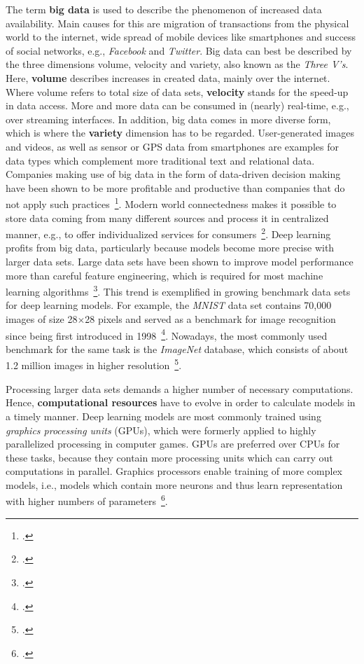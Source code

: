 The term \textbf{big data} is used to describe the phenomenon of increased data
availability.
Main causes for this are migration of transactions from the physical world
to the internet, wide spread of mobile devices like smartphones and success
of social networks, e.g., \textit{Facebook} and \textit{Twitter}.
Big data can best be described by the three dimensions volume, velocity and
variety, also known as the \textit{Three V's}.
Here, \textbf{volume} describes increases in created data, mainly over the 
internet. 
Where volume refers to total size of data sets, \textbf{velocity} stands for the
speed-up in data access. More and more data can be consumed in (nearly) real-time,
e.g., over streaming interfaces.
In addition, big data comes in more diverse form, which is where the \textbf{variety}
dimension has to be regarded.
User-generated images and videos, as well as sensor or GPS data from smartphones
are examples for data types which complement more traditional text and relational
data.
Companies making use of big data in the form of data-driven decision making
have been shown to be more profitable and productive than companies that do not
apply such practices~\footcite{McAfee2012}.
Modern world connectedness makes it possible to store data coming from
many different sources and process it in centralized manner, e.g., to offer
individualized services for consumers~\footcite{Jordan2015}.
Deep learning profits from big data, particularly because models become more
precise with larger data sets.
Large data sets have been shown to improve model performance more than careful
feature engineering, which is required for most machine learning algorithms~\footcite{Goodfellow2016}.
This trend is exemplified in growing benchmark data sets for deep learning
models.
For example, the \textit{MNIST} data set contains 70,000 images of size 28$\times$28 
pixels and served as a benchmark for image recognition since being first
introduced in 1998~\footcite{LeCun1998}.
Nowadays, the most commonly used benchmark for the same task is the \textit{ImageNet}
database, which consists of about 1.2 million images in higher 
resolution~\footcite{Russakovsky2015}.

Processing larger data sets demands a higher number of necessary computations.
Hence, \textbf{computational resources} have to evolve in order to calculate models
in a timely manner.
Deep learning models are most commonly trained using \textit{graphics processing
units} (GPUs), which were formerly applied to highly parallelized processing
in computer games.
GPUs are preferred over CPUs for these tasks, because they contain more
processing units which can carry out computations in parallel.
Graphics processors enable training of more complex models, i.e., models which
contain more neurons and thus learn representation with higher numbers of 
parameters~\footcite{Goodfellow2016, Raina2009}.

